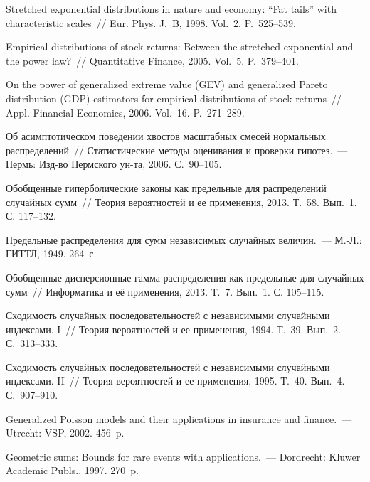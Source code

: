 \begin{multicols}{2}
{{\begin{thebibliography}{99}
Stretched exponential distributions in nature and economy: ``Fat
tails'' with characteristic scales~// Eur. Phys. J.~B,
1998. Vol.~2. P.~525--539.

 Empirical distributions of stock returns: Between the
stretched exponential and the power law?~// Quantitative Finance,
2005. Vol.~5. P.~379--401.

 On the power of generalized extreme value (GEV) and
generalized Pareto distribution (GDP) estimators for empirical
distributions of stock returns~// Appl. Financial Economics, 2006.
Vol.~16. P.~271--289.

 Об
асимптотическом поведении хвостов масштабных смесей нормальных
распределений~// Статистические методы оценивания и проверки
гипотез.~--- Пермь: Изд-во Пермского ун-та, 2006. С.~90--105.

  Обобщенные гиперболические законы
как предельные для распределений случайных сумм~// Теория
вероятностей и ее применения, 2013. Т.~58. Вып.~1. С. 117--132.

 Предельные распределения для
сумм независимых случайных величин.~--- М.-Л.: ГИТТЛ, 1949. 264~с.

  Обобщенные
дисперсионные гамма-распределения как предельные для случайных сумм~// 
Информатика и её применения, 2013. Т.~7. Вып.~1. С. 105--115.

  Сходимость случайных
последовательностей с независимыми случайными индексами. I~// Теория
вероятностей и ее применения, 1994. Т.~39. Вып.~2. С.~313--333.

  Сходимость случайных
последовательностей с независимыми случайными индексами. II~//
Теория вероятностей и ее применения, 1995. Т.~40. Вып.~4. С.~907--910.

 
Generalized Poisson models and their applications in insurance and
finance.~--- Utrecht: VSP, 2002. 456~p.

 Geometric sums: Bounds for rare events with
applications.~--- Dordrecht: Kluwer Academic Publs., 1997. 270~p.


\end{thebibliography}}}
\end{multicols}
